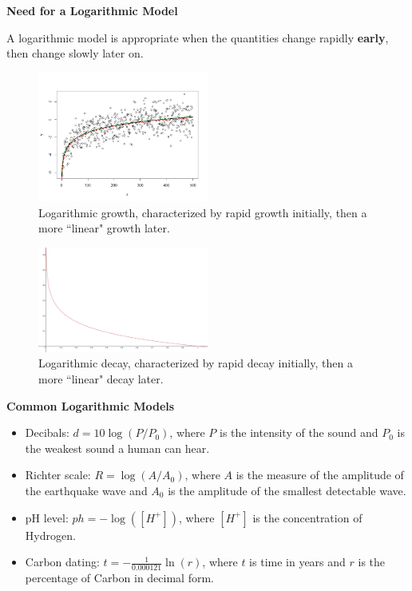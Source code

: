\documentclass{ximera}
\begin{document}
\begin{theorem}
\textbf{Need for a Logarithmic Model}

A logarithmic model is appropriate when the quantities change rapidly \textbf{early}, then change slowly later on. 

\begin{figure}
	\includegraphics[width=0.5\textwidth]{logGrowth.png}
	\caption{Logarithmic growth, characterized by rapid growth initially, then a more ``linear" growth later.}
\end{figure}

\begin{figure}
	\includegraphics[width=0.5\textwidth]{logDecay.png}
	\caption{Logarithmic decay, characterized by rapid decay initially, then a more ``linear" decay later.}
\end{figure}

\end{theorem}

\begin{center} \textbf{\Large Common Logarithmic Models} \end{center}

\begin{itemize}
	\item Decibals: $d = 10 \log(P/P_0)$, where $P$ is the intensity of the sound and $P_0$ is the weakest sound a human can hear.
	\item Richter scale: $R = \log(A/A_0)$, where $A$ is the measure of the amplitude of the earthquake wave and $A_0$ is the amplitude of the smallest detectable wave.
	\item pH level: $ph = -\log([H^+])$, where $[H^+]$ is the concentration of Hydrogen.
	\item Carbon dating: $t = -\frac{1}{0.000121} \ln(r)$, where $t$ is time in years and $r$ is the percentage of Carbon in decimal form.
\end{itemize}
\end{document}
